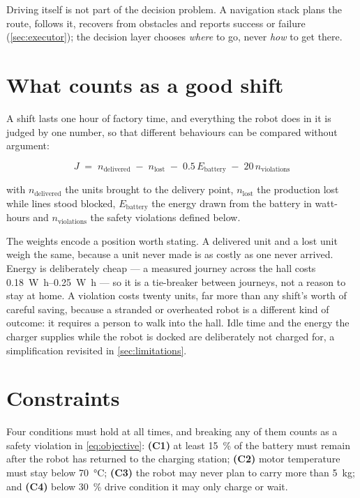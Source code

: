 Driving itself is not part of the decision problem. A navigation stack plans the route, follows it,
recovers from obstacles and reports success or failure (\cref{sec:executor}); the decision layer
chooses \emph{where} to go, never \emph{how} to get there.

\section{What counts as a good shift}
\label{sec:objective}

A shift lasts one hour of factory time, and everything the robot does in it is judged by one
number, so that different behaviours can be compared without argument:

\begin{equation}
    \label{eq:objective}
    J \;=\; n_{\text{delivered}}
        \;-\; n_{\text{lost}}
        \;-\; 0.5\,E_{\text{battery}}
        \;-\; 20\,n_{\text{violations}}
\end{equation}

with $n_{\text{delivered}}$ the units brought to the delivery point, $n_{\text{lost}}$ the
production lost while lines stood blocked, $E_{\text{battery}}$ the energy drawn from the battery in
watt-hours and $n_{\text{violations}}$ the safety violations defined below.

The weights encode a position worth stating. A delivered unit and a lost unit weigh the same,
because a unit never made is as costly as one never arrived. Energy is deliberately cheap --- a
measured journey across the hall costs \SIrange{0.18}{0.25}{\watt\hour} --- so it is a tie-breaker
between journeys, not a reason to stay at home. A violation costs twenty units, far more than any
shift's worth of careful saving, because a stranded or overheated robot is a different kind of
outcome: it requires a person to walk into the hall. Idle time and the energy the charger supplies
while the robot is docked are deliberately not charged for, a simplification revisited in
\cref{sec:limitations}.

\section{Constraints}
\label{sec:constraints}

Four conditions must hold at all times, and breaking any of them counts as a safety violation in
\cref{eq:objective}: \textbf{(C1)} at least \SI{15}{\percent} of the battery must remain after the
robot has returned to the charging station; \textbf{(C2)} motor temperature must stay below
\SI{70}{\degreeCelsius}; \textbf{(C3)} the robot may never plan to carry more than
\SI{5}{\kilo\gram}; and \textbf{(C4)} below \SI{30}{\percent} drive condition it may only charge or
wait.

